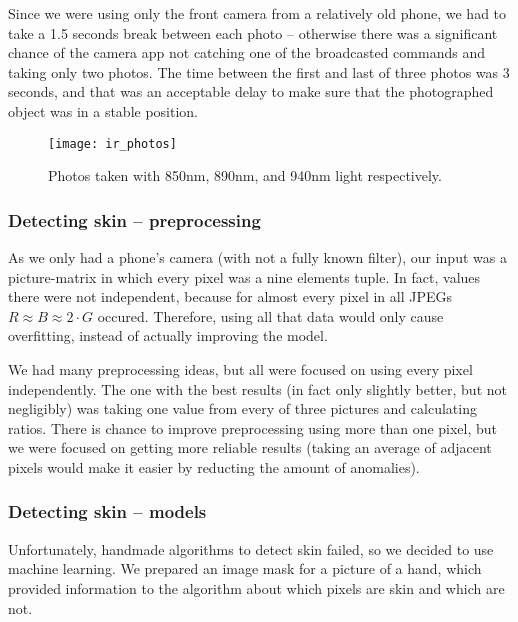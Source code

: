            Since we were using only the front camera from a relatively old phone,
            we had to take a 1.5 seconds break between each photo -- otherwise
            there was a significant chance of the camera app not catching one of the
            broadcasted commands and taking only two photos.
            The time between the first and last of three photos was 3 seconds,
            and that was an acceptable delay to make sure that the photographed
            object was in a stable position.

            \begin{figure}[H]
                \caption{Photos taken with 850nm, 890nm, and 940nm light respectively.}
                \centering
                \texttt{[image: ir\_photos]}
                \label{fig:ir_photos}
            \end{figure}

            \subsubsection*{Detecting skin -- preprocessing}
                As we only had a phone's camera (with not a fully known filter),
                our input was a picture-matrix
                in which every pixel was a nine elements tuple.
                In fact, values there were not independent, because
                for almost every pixel in all JPEGs
                $R \approx B \approx 2 \cdot G$ occured.
                Therefore, using all that data would only cause overfitting,
                instead of actually improving the model.

                We had many preprocessing ideas, but all were focused
                on using every pixel independently.
                The one with the best results (in fact only slightly better,
                but not negligibly) was taking one value from every
                of three pictures and calculating ratios.
                There is chance to improve preprocessing using more than one pixel,
                but we were focused on getting more reliable results
                (taking an average of adjacent pixels would make it easier
                by reducting the amount of anomalies).

            \subsubsection*{Detecting skin -- models}
                Unfortunately, handmade algorithms to detect skin failed,
                so we decided to use machine learning.
                We prepared an image mask for a picture of a hand,
                which provided information to the algorithm
                about which pixels are skin and which are not.

